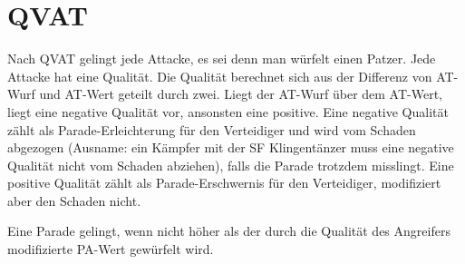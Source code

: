 %

\section{QVAT}
Nach QVAT gelingt jede Attacke, es sei denn man würfelt einen Patzer. Jede
Attacke hat eine Qualität. Die Qualität berechnet sich aus der Differenz von
AT-Wurf und AT-Wert geteilt durch zwei. Liegt der AT-Wurf über dem AT-Wert,
liegt eine negative Qualität vor, ansonsten eine positive. Eine negative
Qualität zählt als Parade-Erleichterung für den Verteidiger und wird vom
Schaden abgezogen (Ausname: ein Kämpfer mit der SF Klingentänzer muss eine
negative Qualität nicht vom Schaden abziehen), falls die Parade trotzdem
misslingt. Eine positive Qualität zählt als Parade-Erschwernis für den
Verteidiger, modifiziert aber den Schaden nicht.

Eine Parade gelingt, wenn nicht höher als der durch die Qualität des Angreifers
modifizierte PA-Wert gewürfelt wird.
